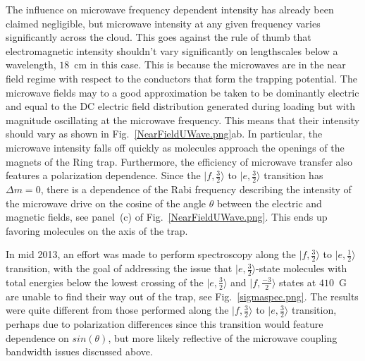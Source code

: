 \documentclass[defaultstyle,11pt]{thesis}
\begin{document}
The influence on microwave frequency dependent intensity has already been claimed negligible, but microwave intensity at any given frequency varies significantly across the cloud.
This goes against the rule of thumb that electromagnetic intensity shouldn't vary significantly on lengthscales below a wavelength, $18$~cm in this case.
This is because the microwaves are in the near field regime with respect to the conductors that form the trapping potential.
The microwave fields may to a good approximation be taken to be dominantly electric and equal to the DC electric field distribution generated during loading but with magnitude oscillating at the microwave frequency.
This means that their intensity should vary as shown in Fig.~\ref{NearFieldUWave.png}ab.
In particular, the microwave intensity falls off quickly as molecules approach the openings of the magnets of the Ring trap.
Furthermore, the efficiency of microwave transfer also features a polarization dependence.
Since the $|f,\frac{3}{2}\rangle$ to $|e,\frac{3}{2}\rangle$ transition has $\Delta m=0$, there is a dependence of the Rabi frequency describing the intensity of the microwave drive on the cosine of the angle $\theta$ between the electric and magnetic fields, see panel~(c) of Fig.~\ref{NearFieldUWave.png}.
This ends up favoring molecules on the axis of the trap.


In mid 2013, an effort was made to perform spectroscopy along the $|f, \frac{3}{2}\rangle$ to $|e, \frac{1}{2}\rangle$ transition, with the goal of addressing the issue that $|e,\frac{3}{2}\rangle$-state molecules with total energies below the lowest crossing of the $|e,\frac{3}{2}\rangle$ and $|f,\frac{-3}{2}\rangle$ states at $410$~G are unable to find their way out of the trap, see Fig.~\ref{sigmaspec.png}.
The results were quite different from those performed along the $|f, \frac{3}{2}\rangle$ to $|e, \frac{3}{2}\rangle$ transition, perhaps due to polarization differences since this transition would feature dependence on $sin(\theta)$, but more likely reflective of the microwave coupling bandwidth issues discussed above.
\end{document}
